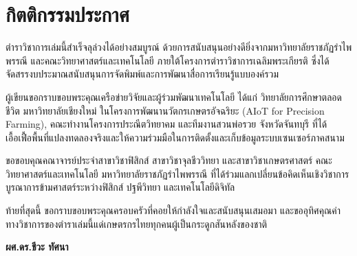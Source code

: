 \chapter*{กิตติกรรมประกาศ}

ตำราวิชาการเล่มนี้สำเร็จลุล่วงได้อย่างสมบูรณ์ ด้วยการสนับสนุนอย่างดียิ่งจากมหาวิทยาลัยราชภัฏรำไพพรรณี และคณะวิทยาศาสตร์และเทคโนโลยี ภายใต้โครงการตำราวิชาการเฉลิมพระเกียรติ ซึ่งได้จัดสรรงบประมาณสนับสนุนการจัดพิมพ์และการพัฒนาสื่อการเรียนรู้แบบองค์รวม

ผู้เขียนขอกราบขอบพระคุณเครือข่ายวิจัยและผู้ร่วมพัฒนาเทคโนโลยี ได้แก่ วิทยาลัยการศึกษาตลอดชีวิต มหาวิทยาลัยเชียงใหม่ ในโครงการพัฒนานวัตกรเกษตรอัจฉริยะ (AIoT for Precision Farming), คณะทำงานโครงการประณีตวิทยาคม และทีมงานสวนพ่อรวย จังหวัดจันทบุรี ที่ได้เอื้อเฟื้อพื้นที่แปลงทดลองจริงและให้ความร่วมมือในการติดตั้งและเก็บข้อมูลระบบเซนเซอร์ภาคสนาม

ขอขอบคุณคณาจารย์ประจำสาขาวิชาฟิสิกส์ สาขาวิชาจุลชีววิทยา และสาขาวิชาเกษตรศาสตร์ คณะวิทยาศาสตร์และเทคโนโลยี มหาวิทยาลัยราชภัฏรำไพพรรณี ที่ได้ร่วมแลกเปลี่ยนข้อคิดเห็นเชิงวิชาการ บูรณาการข้ามศาสตร์ระหว่างฟิสิกส์ ปฐพีวิทยา และเทคโนโลยีดิจิทัล

ท้ายที่สุดนี้ ขอกราบขอบพระคุณครอบครัวที่คอยให้กำลังใจและสนับสนุนเสมอมา และขออุทิศคุณค่าทางวิชาการของตำราเล่มนี้แด่เกษตรกรไทยทุกคนผู้เป็นกระดูกสันหลังของชาติ

\vspace{1.5cm}
\begin{flushright}
    \textbf{ผศ.ดร.ชีวะ ทัศนา}
\end{flushright}
